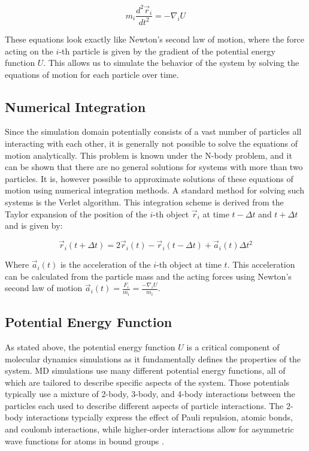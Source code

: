 \begin{equation}
      m_i \frac{d^2 \vec{r}_i}{dt^2} = -\nabla_i U
\end{equation}

These equations look exactly like Newton's second law of motion, where the force acting on the $i$-th particle is given by the gradient of the potential energy function $U$. This allows us to simulate the behavior of the system by solving the equations of motion for each particle over time.

\subsection{Numerical Integration}

Since the simulation domain potentially consists of a vast number of particles all interacting with each other, it is generally not possible to solve the equations of motion analytically. This problem is known under the N-body problem, and it can be shown that there are no general solutions for systems with more than two particles. It is, however possible to approximate solutions of these equations of motion using numerical integration methods. A standard method for solving such systems is the Verlet algorithm. This integration scheme is derived from the Taylor expansion of the position of the $i$-th object $\vec{r}_i$ at time $t - \Delta t$ and $t + \Delta t$ and is given by:

\begin{equation}
      \vec{r}_i(t + \Delta t) = 2 \vec{r}_i(t) - \vec{r}_i(t - \Delta t) + \vec{a}_i(t) \Delta t^2
\end{equation}

Where $\vec{a}_i(t)$ is the acceleration of the $i$-th object at time $t$. This acceleration can be calculated from the particle mass and the acting forces using Newton's second law of motion $\vec{a}_i(t) =\frac{F_i}{m_i}= \frac{-\nabla_i U}{m_i}$.

\subsection{Potential Energy Function}

As stated above, the potential energy function $U$ is a critical component of molecular dynamics simulations as it fundamentally defines the properties of the system. MD simulations use many different potential energy functions, all of which are tailored to describe specific aspects of the system. Those potentials typically use a mixture of 2-body, 3-body, and 4-body interactions between the particles each used to describe different aspects of particle interactions. The 2-body interactions typcially express the effect of Pauli repulsion, atomic bonds, and coulomb interactions, while higher-order interactions allow for asymmetric wave functions for atoms in bound groups \cite{Leimkuhler2015}.

